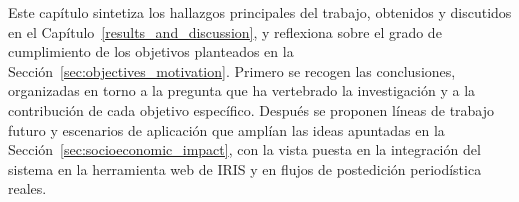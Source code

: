 
Este capítulo sintetiza los hallazgos principales del trabajo, obtenidos y discutidos
en el Capítulo~\ref{results_and_discussion}, y reflexiona sobre el grado de
cumplimiento de los objetivos planteados en la Sección~\ref{sec:objectives_motivation}.
Primero se recogen las conclusiones, organizadas en torno a la pregunta que ha
vertebrado la investigación y a la contribución de cada objetivo específico. Después
se proponen líneas de trabajo futuro y escenarios de aplicación que amplían las ideas
apuntadas en la Sección~\ref{sec:socioeconomic_impact}, con la vista puesta en la
integración del sistema en la herramienta web de IRIS y en flujos de postedición periodística
reales.
